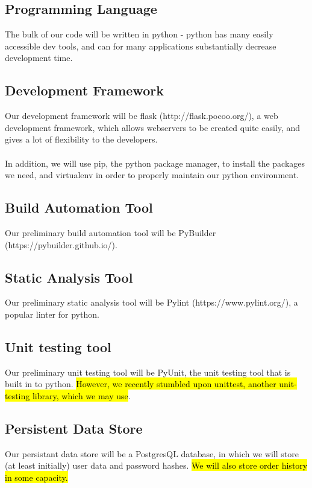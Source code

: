 \documentclass{article}
\begin{document}
\subsection{Programming Language}
The bulk of our code will be written in python - python has many easily accessible dev tools, and can for many applications substantially decrease development time. 
\subsection{Development Framework}
Our development framework will be flask (http://flask.pocoo.org/), a web development framework, which allows webservers to be created quite easily, and gives a lot of flexibility to the developers. \\
\\
In addition, we will use pip, the python package manager, to install the packages we need, and virtualenv in order to properly maintain our python environment. 
\subsection{Build Automation Tool}
Our preliminary build automation tool will be PyBuilder (https://pybuilder.github.io/).
\subsection{Static Analysis Tool}
Our preliminary static analysis tool will be Pylint (https://www.pylint.org/), a popular linter for python.
\subsection{Unit testing tool}
Our preliminary unit testing tool will be PyUnit, the unit testing tool that is built in to python. \hl{However, we recently stumbled upon unittest, another unit-testing library, which we may use}.
\subsection{Persistent Data Store} 
Our persistant data store will be a PostgresQL database, in which we will store (at least initially) user data and password hashes. \hl{We will also store order history in some capacity.}
\end{document}
